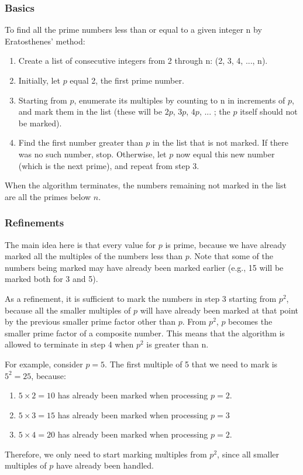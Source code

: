 \subsubsection{Basics}
To find all the prime numbers less than or equal to a given integer n by Eratosthenes' method:
\begin{enumerate}
\item Create a   list of consecutive integers from 2 through n: (2, 3, 4, ..., n).
\item Initially, let $p$ equal 2, the first prime number.
\item Starting from $p$, enumerate its multiples by counting to n in increments of  $p$, and mark them in the list (these will be $2p$, $3p$, $4p$, ... ; the $p$ itself should not be marked).
\item Find the first number greater than $p$ in the list that is not marked. If there was no such number, stop. Otherwise, let $p$ now equal this new number (which is the next prime), and repeat from step 3.
\end{enumerate}

When the algorithm terminates, the numbers remaining not marked in the list are all the primes below $n$.

\subsubsection{Refinements}
The main idea here is that every value for $p$ is prime, because we have already marked all the multiples of the numbers less than $p$. Note that some of the numbers being marked may have already been marked earlier (e.g., 15 will be marked both for 3 and 5).

As a refinement, it is sufficient to mark the numbers in step 3 starting from $p^2$, because all the smaller multiples of $p$ will have already been marked at that point by the previous smaller prime factor other than $p$. From $p^2$, $p$ becomes the smaller prime factor of a composite number. This means that the algorithm is allowed to terminate in step 4 when $p^2$ is greater than n.

For example, consider $p=5$. The first multiple of 5 that we need to mark is $5^2 = 25$, because: 
\begin{enumerate}
\item $5 \times 2 = 10$ has already been marked when processing $p = 2$.
\item $5 \times 3 = 15$ has already been marked when processing $p = 3$ 
\item $5 \times 4 = 20$ has already been marked when processing $p = 2$. 
\end{enumerate}
Therefore, we only need to start marking multiples from $p^2$, since all smaller multiples of $p$ have already been handled.

